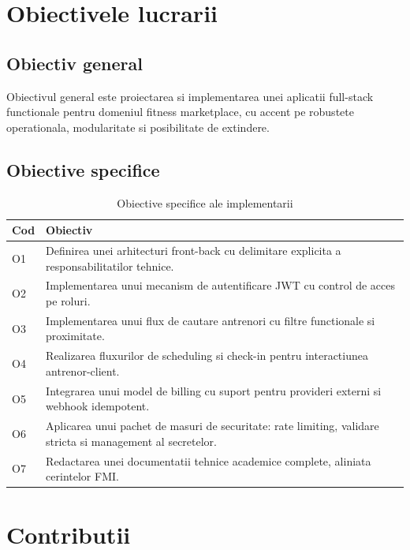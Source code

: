 \section{Obiectivele lucrarii}

\subsection{Obiectiv general}

Obiectivul general este proiectarea si implementarea unei aplicatii full-stack functionale pentru domeniul fitness marketplace, cu accent pe robustete operationala, modularitate si posibilitate de extindere.

\subsection{Obiective specifice}

\begin{table}[H]
\centering
\caption{Obiective specifice ale implementarii}
\begin{tabular}{p{} p{}}
\toprule
\textbf{Cod} & \textbf{Obiectiv} \\
\midrule
O1 & Definirea unei arhitecturi front-back cu delimitare explicita a responsabilitatilor tehnice. \\
O2 & Implementarea unui mecanism de autentificare JWT cu control de acces pe roluri. \\
O3 & Implementarea unui flux de cautare antrenori cu filtre functionale si proximitate. \\
O4 & Realizarea fluxurilor de scheduling si check-in pentru interactiunea antrenor-client. \\
O5 & Integrarea unui model de billing cu suport pentru provideri externi si webhook idempotent. \\
O6 & Aplicarea unui pachet de masuri de securitate: rate limiting, validare stricta si management al secretelor. \\
O7 & Redactarea unei documentatii tehnice academice complete, aliniata cerintelor FMI. \\
\bottomrule
\end{tabular}
\end{table}

\section{Contributii}

